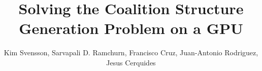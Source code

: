 \documentclass{llncs}
\begin{document}


\title{Solving the Coalition Structure Generation Problem on a GPU}




%
%
%
%

%


%
\author{Kim Svensson, Sarvapali D. Ramchurn, Francisco Cruz, Juan-Antonio Rodriguez, Jesus Cerquides}
\end{document}
